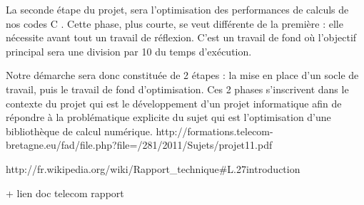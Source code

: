 La seconde \'etape du projet, sera l'optimisation des performances de calculs de nos codes C . Cette phase, plus courte, se veut diff\'erente de la 
premi\`ere : elle n\'ecessite avant tout un travail de r\'eflexion. C'est  un travail de fond o\`u l'objectif principal sera une division par 10 du temps
 d'ex\'ecution. 

Notre d\'emarche sera donc constitu\'ee de 2 \'etapes : la mise en place d'un socle de travail, puis le travail de fond d'optimisation. Ces 2 phases 
s'inscrivent dans le contexte du projet qui est le d\'eveloppement d'un projet informatique afin de r\'epondre \`a la probl\'ematique explicite du sujet 
qui est l'optimisation d'une biblioth\`eque de calcul num\'erique.
\newline
\newline
http://formations.telecom-bretagne.eu/fad/file.php?file=/281/2011/Sujets/projet11.pdf 

http://fr.wikipedia.org/wiki/Rapport\_technique\#L.27introduction 

+ lien doc telecom rapport 


